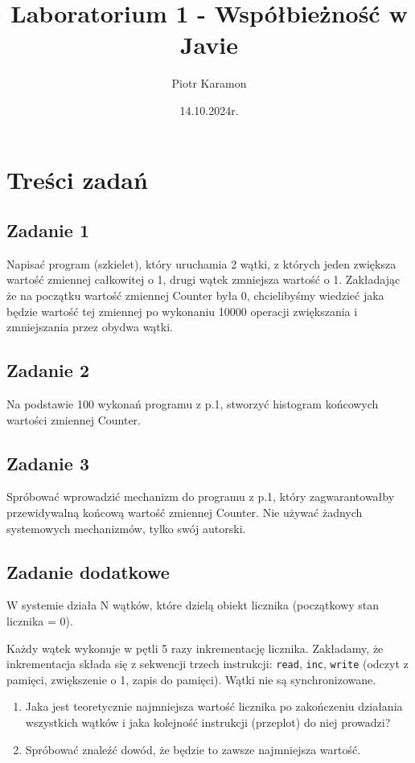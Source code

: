 \documentclass[11pt]{article}
\author{Piotr Karamon}
\date{14.10.2024r.}
\title{Laboratorium 1 - Współbieżność w Javie}
\begin{document}
\maketitle
\section*{Treści zadań}
\label{sec:org7048e4d}
\subsection*{Zadanie 1}
\label{sec:org81f9ab8}
Napisać program (szkielet), który uruchamia 2 wątki, z których jeden zwiększa
wartość zmiennej całkowitej o 1, drugi wątek zmniejsza wartość o 1. Zakładając
że na początku wartość zmiennej Counter była 0, chcielibyśmy wiedzieć jaka
będzie wartość tej zmiennej po wykonaniu 10000 operacji zwiększania i
zmniejszania przez obydwa wątki.
\subsection*{Zadanie 2}
\label{sec:org004b859}
Na podstawie 100 wykonań programu z p.1, stworzyć histogram końcowych wartości zmiennej Counter.
\subsection*{Zadanie 3}
\label{sec:org310d0c5}
Spróbować wprowadzić mechanizm do programu z p.1, który zagwarantowałby przewidywalną końcową wartość zmiennej Counter. Nie używać żadnych systemowych mechanizmów, tylko swój autorski.
\subsection*{Zadanie dodatkowe}
\label{sec:orgd5df1a5}
W systemie działa N wątków, które dzielą obiekt licznika (początkowy stan licznika = 0).

Każdy wątek wykonuje w pętli 5 razy inkrementację licznika. Zakładamy, że inkrementacja składa się z sekwencji trzech instrukcji: \texttt{read}, \texttt{inc}, \texttt{write} (odczyt z pamięci, zwiększenie o 1, zapis do pamięci). Wątki nie są synchronizowane.

\begin{enumerate}
\item Jaka jest teoretycznie najmniejsza wartość licznika po zakończeniu działania wszystkich wątków i jaka kolejność instrukcji (przeplot) do niej prowadzi?
\item Spróbować znaleźć dowód, że będzie to zawsze najmniejsza wartość.
\end{enumerate}
\end{document}
